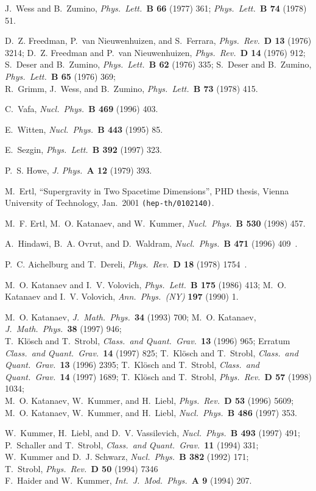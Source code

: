 \documentclass[a4paper,10pt]{article}
\renewcommand{\^}{{}^}
\renewcommand{\_}{\!{}_}
\newcommand\ap[3]    
		{{\it Ann.\ Phys.\ (NY) }{\bf #1} (#2) #3}
\newcommand\cqg[3]  
		{{\it Class.\ and Quant.\ Grav.\ }{\bf #1} (#2) #3}
\newcommand\ijmpa[3] 
		{{\it Int.\ J.\ Mod.\ Phys.\ }{\bf A #1} (#2) #3}
\newcommand\jpha[3]  
		{{\it J. Phys.\ }{\bf A #1} (#2) #3}
\newcommand\jmp[3]   
		{{\it J.\ Math.\ Phys.\ }{\bf #1} (#2) #3}
\newcommand\npb[3]   
		{{\it Nucl.\ Phys.\ }{\bf B #1} (#2) #3}
\newcommand\plb[3]   
		{{\it Phys.\ Lett.\ }{\bf B #1} (#2) #3}
\newcommand\prd[3]   
		{{\it Phys.\ Rev.\ }{\bf D #1} (#2) #3}
\begin{document}
\begin{thebibliography}{99}

J.~Wess and B.~Zumino, \plb{66}{1977}{361};
\plb{74}{1978}{51}.

D.~Z. Freedman, P.~{van Nieuwenhuizen}, and S.~Ferrara, 
\prd{13}{1976}{3214}; 
D.~Z. Freedman and P.~{van Nieuwenhuizen}, 
\prd{14}{1976}{912};\\ 
S.~Deser and B.~Zumino, \plb{62}{1976}{335}; 
S.~Deser and B.~Zumino, \plb{65}{1976}{369}; \\
R.~Grimm, J.~Wess, and B.~Zumino, \plb{73}{1978}{415}. 

C.~Vafa, \npb{469}{1996}{403}. 

E.~Witten, \npb{443}{1995}{85}. 

E.~Sezgin, \plb{392}{1997}{323}. 

P.~S. Howe, \jpha{12}{1979}{393}.

M.\ Ertl, ``Supergravity in Two Spacetime Dimensions'', PHD 
thesis, Vienna University of Technology, Jan.\ 2001 
\texttt{(hep-th/0102140)}. 

M.~F. Ertl, M.~O. Katanaev, and W.~Kummer, 
\npb{530}{1998}{457}.

A.~Hindawi, B.~A. Ovrut, and D.~Waldram, 
\npb{471}{1996}{409}\, . 

P.~C. Aichelburg and T.~Dereli, \prd{18}{1978}{1754}\, .

M.~O. Katanaev and I.~V. Volovich, \plb{175}{1986}{413}; 
M.~O. Katanaev and I.~V. Volovich, \ap{197}{1990}{1}. 

M.~O. Katanaev, \jmp{34}{1993}{700}; 
M.~O. Katanaev, \jmp{38}{1997}{946}; \\
T.~Kl{\"o}sch and T.~Strobl, 
\cqg{13}{1996}{965}; Erratum  \cqg{14}{1997}{825}; 
T.~Kl{\"o}sch and T.~Strobl, \cqg{13}{1996}{2395}; 
T.~Kl{\"o}sch and T.~Strobl, \cqg{14}{1997}{1689}; 
T.~Kl{\"o}sch and T.~Strobl, \prd{57}{1998}{1034};\\ 
M.~O. Katanaev, W.~Kummer, and H.~Liebl, \prd{53}{1996}{5609}; 
M.~O. Katanaev, W.~Kummer, and H.~Liebl, 
\npb{486}{1997}{353}. 

W.~Kummer, H.~Liebl, and D.~V. Vassilevich, 
\npb{493}{1997}{491}; \\ 
P.~Schaller and T.~Strobl, \cqg{11}{1994}{331}; \\
W.~Kummer and D.~J. Schwarz, \npb{382}{1992}{171}; \\
T.~Strobl, \prd{50}{1994}{7346}\; \\
F.~Haider and W.~Kummer, \ijmpa{9}{1994}{207}.  


\end{thebibliography}
\end{document}
